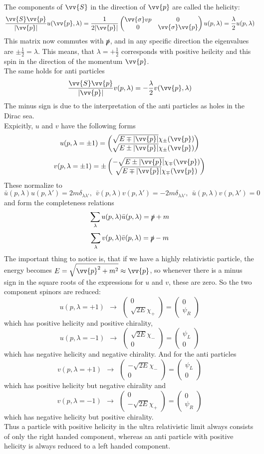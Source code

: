 \documentclass{include/thesisclass}
\newcommand{\vp}{\vv{p}}
\newcommand{\df}{\rightarrow}
\newcommand{\vektorz}[2]{\begin{pmatrix} #1 \\ #2 \end{pmatrix}}
\newcommand{\Matz}[4]{\begin{pmatrix}#1&#2\\#3&#4\end{pmatrix}}
\begin{document}
The components of $\vv{S}$ in the direction of $\vp$ are called the helicity:
\[\frac{\vv{S}\vp}{|\vp|} u(\vp, \lambda) = \frac{1}{2|\vp|}\Matz{\vv{\sigma}vp}{0}{0}{\vv{\sigma}\vp}u(p,\lambda) = \frac{\lambda}{2}u(p,\lambda)\]
This matrix now commutes with $\slashed{p}$, and in any specific direction the eigenvalues are $\pm \frac{1}{2} = \lambda$. This means, that $\lambda = + \frac{1}{2}$ corresponds with positive heilcity and this spin in the direction of the momentum $\vp$.\\
The same holds for anti particles
\[ \frac{ \vv{S}\vp }{ |\vp| } v(p,\lambda) = - \frac{\lambda}{2}v(\vp, \lambda)\]
The minus sign is due to the interpretation of the anti particles as holes in the Dirac sea.\\
Expicitly, $u$ and $v$ have the following forms
\[ u(p, \lambda = \pm 1) = \vektorz{ \sqrt{ E\mp |\vp|} \chi_\pm(\vp)}{\sqrt{E\pm|\vp|} \chi_\pm(\vp)}\]
\[ v(p, \lambda = \pm 1) = \pm\vektorz{-\sqrt{E\pm|\vp|} \chi_\mp(\vp)}{\sqrt{E\mp |\vp|}\chi_\mp(\vp)}\]
These normalize to
\[ \bar{u}(p, \lambda) u(p, \lambda') = 2m \delta_{\lambda\lambda'}, ~~\bar{v}(p, \lambda)v(p, \lambda') = - 2m \delta_{\lambda\lambda'}, ~~ \bar{u}(p, \lambda)v(p,\lambda') = 0\]
and form the completeness relations
\[ \sum_\lambda u(p,\lambda) \bar{u}(p,\lambda) = \slashed{p} + m\]
\[ \sum_\lambda v(p, \lambda) \bar{v}(p,\lambda) = \slashed{p} - m\]
The important thing to notice is, that if we have a highly relativistic particle, the energy becomes $E = \sqrt{\vp^2 + m^2} \approx \vp$, so whenever there is a minus sign in the square roots of the expressions for $u$ and $v$, these are zero. So the two component spinors are reduced:
\[ u(p, \lambda = +1) ~~\df~~ \vektorz{0}{\sqrt{2E} \chi_+} = \vektorz{0}{\psi_R}\]
which has positive helicity and positive chirality,
\[ u(p, \lambda = -1) ~~\df~~ \vektorz{\sqrt{2E} \chi_-}{0} = \vektorz{\psi_L}{0}\]
which has negative helicity and negative chirality. And for the anti particles
\[v(p, \lambda = +1) ~~\df~~\vektorz{-\sqrt{2E}\chi_-}{0} = \vektorz{\psi_L}{0}\]
which has positive helicity but negative chirality and
\[v(p, \lambda = -1) ~~\df~~\vektorz{0}{- \sqrt{2E} \chi_+} = \vektorz{0}{\psi_R}\]
which has negative helicity but positive chirality.\\
Thus a particle with positive helicity in the ultra relativistic limit always consists of only the right handed component, whereas an anti particle with positive helicity is always reduced to a left handed component.
\end{document}
